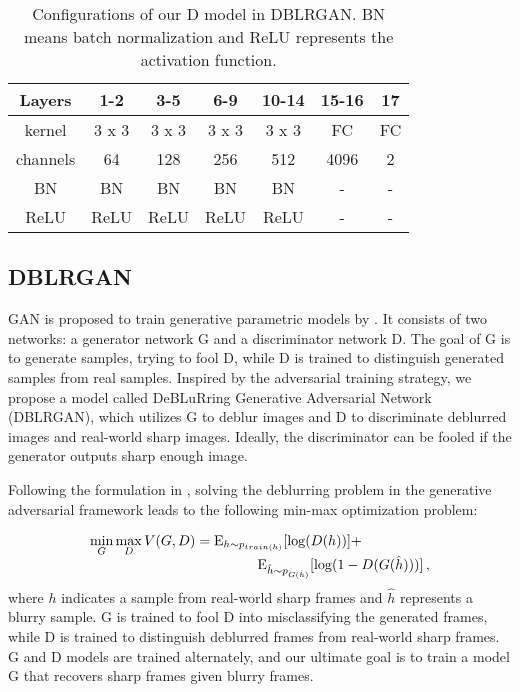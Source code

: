 \documentclass[journal]{IEEEtran}
\begin{document}
\begin{table}
\centering
   \scriptsize
   \caption{Configurations of our D model in DBLRGAN. BN means batch normalization and ReLU represents the activation function.}
    \begin{tabular}{c|cccccc}
    \toprule
     Layers & 1-2 & 3-5 & 6-9 & 10-14 & 15-16 & 17 \\ 
     \midrule
     kernel & 3 x 3 & 3 x 3 & 3 x 3 & 3 x 3 & FC & FC \\ 
     channels & 64 & 128 & 256 & 512 & 4096 & 2 \\
     BN & BN & BN & BN & BN & - & - \\
     ReLU & ReLU & ReLU & ReLU & ReLU & - & - \\
    \bottomrule
    \end{tabular}
  \label{table2}
\end{table}



\subsection{DBLRGAN}
GAN is proposed to train generative parametric models by \cite{goodfellow2014generative}. It consists of two networks: a generator network G and a discriminator network D. The goal of G is to generate samples, trying to fool D, while D is trained to distinguish generated samples from real samples. Inspired by the adversarial training strategy, we propose a model called DeBLuRring Generative Adversarial Network (DBLRGAN), which utilizes G to deblur images and D to discriminate deblurred images and real-world sharp images. Ideally, the discriminator can be fooled if the generator outputs sharp enough image.

Following the formulation in \cite{goodfellow2014generative}, solving the deblurring problem in the generative adversarial framework leads to the following min-max optimization problem:

\begin{equation}
\begin{array}{l}
\mathop {\min }\limits_G \mathop {\max }\limits_D V(G,D) = {{\rm E}_{h \sim {p_{train(h)}}}}[\log (D(h))] + \\
\ \ \ \ \ \ \ \ \ \ \ \ \ \ \ \ \ \ \ \ \ \ \ \ \ \ \ \ \ \ \ \ \ \ \ \ {{\rm E}_{\hat{h} \sim {p_{G(\hat{h})}}}}[\log (1 - D(G(\hat{h})))]\, ,
\end{array}
\end{equation}
where $h$ indicates a sample from real-world sharp frames and $\hat{h}$ represents a blurry sample. G is trained to fool D into misclassifying the generated frames, while D is trained to distinguish deblurred frames from real-world sharp frames. G and D models are trained alternately, and our ultimate goal is to train a model G that recovers sharp frames given blurry frames.
\end{document}
